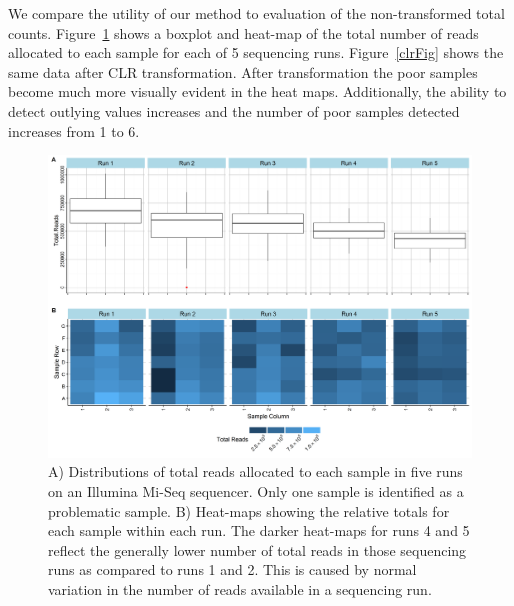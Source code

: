 We compare the utility of our method to evaluation of the non-transformed total counts.  Figure~\ref{totalFig} shows a boxplot and heat-map of the total number of reads allocated to each sample for each of 5 sequencing runs.  Figure~\ref{clrFig} shows the same data after CLR transformation.  After transformation the poor samples become much more visually evident in the heat maps.  Additionally, the ability to detect outlying values increases and the number of poor samples detected increases from 1 to 6.  

\begin{figure}
\includegraphics[scale=.5]{./Figures/IO_Repro_Combined_RawTotals}
\caption{A) Distributions of total reads allocated to each sample in five runs on an Illumina Mi-Seq sequencer. Only one sample is identified as a problematic sample. B) Heat-maps showing the relative totals for each sample within each run.  The darker heat-maps for runs 4 and 5 reflect the generally lower number of total reads in those sequencing runs as compared to runs 1 and 2.  This is caused by normal variation in the number of reads available in a sequencing run.}
\label{totalFig}
\end{figure}
 
